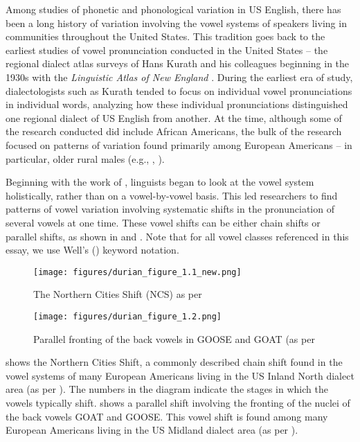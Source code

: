 \documentclass[output=paper,colorlinks,citecolor=brown]{langscibook}
\begin{document}
Among studies of phonetic and phonological variation in US English, there has been a long history of variation involving the vowel systems of speakers living in communities throughout the United States. This tradition goes back to the earliest studies of vowel pronunciation conducted in the United States -- the regional dialect atlas surveys of Hans Kurath and his colleagues beginning in the 1930s with the \textit{Linguistic Atlas of New England} \citep{Kurath1939}. During the earliest era of study, dialectologists such as Kurath tended to focus on individual vowel pronunciations in individual words, analyzing how these individual pronunciations distinguished one regional dialect of US English from another. At the time, although some of the research conducted did include African Americans, the bulk of the research focused on patterns of variation found primarily among European Americans -- in particular, older rural males (e.g., \citealt{kurath1961pronunciation,wetmore1959low}, \citealt{atwood1951some}).

 Beginning with the work of \citet{labov1972quantitative}, linguists began to look at the vowel system holistically, rather than on a vowel-by-vowel basis. This led researchers to find patterns of vowel variation involving systematic shifts in the pronunciation of several vowels at one time. These vowel shifts can be either chain shifts or parallel shifts, as shown in  and . Note that for all vowel classes referenced in this essay, we use Well's (\citeyear{wells1982accents}) keyword notation.



\begin{figure}
\texttt{[image: figures/durian\_figure\_1.1\_new.png]}
\caption{The Northern Cities Shift (NCS) as per \citet{labov2006atlas}}
\label{fig:durian:1}
 \end{figure}



\begin{figure}
\texttt{[image: figures/durian\_figure\_1.2.png]}
\caption{Parallel fronting of the back vowels in GOOSE and GOAT (as per \citet{durian2012new}}
\label{fig:durian:2}
 \end{figure}

 shows the Northern Cities Shift, a commonly described chain shift found in the vowel systems of many European Americans living in the US Inland North dialect area (as per \citealt{labov2006atlas}). The numbers in the diagram indicate the stages in which the vowels typically shift.  shows a parallel shift involving the fronting of the nuclei of the back vowels GOAT and GOOSE. This vowel shift is found among many European Americans living in the US Midland dialect area (as per \citealt{durian2012new}).
\end{document}
